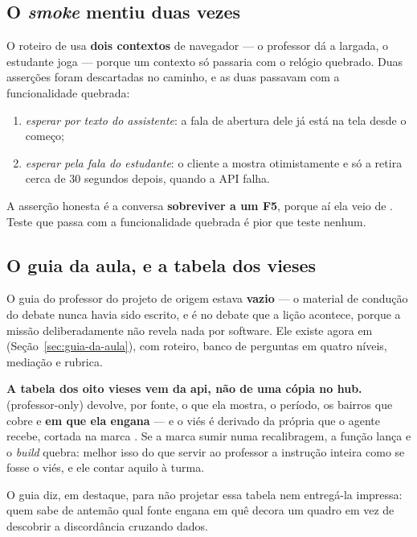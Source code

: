 \subsection{O \emph{smoke} mentiu duas vezes}

O roteiro de  usa \textbf{dois
contextos} de navegador --- o professor dá a largada, o estudante joga --- porque um
contexto só passaria com o relógio quebrado. Duas asserções foram descartadas no
caminho, e as duas passavam com a funcionalidade quebrada:

\begin{enumerate}
  \item \emph{esperar por texto do assistente}: a fala de abertura dele já está
    na tela desde o começo;
  \item \emph{esperar pela fala do estudante}: o cliente a mostra otimistamente e só
    a retira cerca de 30 segundos depois, quando a API falha.
\end{enumerate}

A asserção honesta é a conversa \textbf{sobreviver a um F5}, porque aí ela veio de
. Teste que passa com a funcionalidade quebrada é pior que
teste nenhum.

\subsection{O guia da aula, e a tabela dos vieses}

O guia do professor do projeto de origem estava \textbf{vazio} --- o material de
condução do debate nunca havia sido escrito, e é no debate que a lição acontece,
porque a missão deliberadamente não revela nada por software. Ele existe agora
em 
(Seção~\ref{sec:guia-da-aula}), com roteiro, banco de perguntas em quatro níveis,
mediação e rubrica.

\begin{decisao}
\textbf{A tabela dos oito vieses vem da api, não de uma cópia no hub.}
 (professor-only) devolve, por fonte, o que
ela mostra, o período, os bairros que cobre e \textbf{em que ela engana} --- e o
viés é derivado da própria  que o agente recebe, cortada na marca
. Se a marca sumir numa recalibragem, a função lança e o \emph{build}
quebra: melhor isso do que servir ao professor a instrução inteira como se fosse
o viés, e ele contar aquilo à turma.

O guia diz, em destaque, para não projetar essa tabela nem entregá-la impressa:
quem sabe de antemão qual fonte engana em quê decora um quadro em vez de
descobrir a discordância cruzando dados.
\end{decisao}

